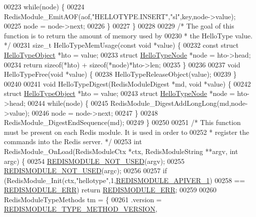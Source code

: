 \begin{DoxyCode}
{00223     \textcolor{keywordflow}{while}(node) \{
00224         RedisModule\_EmitAOF(aof,\textcolor{stringliteral}{"HELLOTYPE.INSERT"},\textcolor{stringliteral}{"sl"},key,node->value);
00225         node = node->next;
00226     \}
00227 \}
00228 
00229 \textcolor{comment}{/* The goal of this function is to return the amount of memory used by}
00230 \textcolor{comment}{ * the HelloType value. */}
00231 size\_t HelloTypeMemUsage(\textcolor{keyword}{const} \textcolor{keywordtype}{void} *value) \{
00232     \textcolor{keyword}{const} \textcolor{keyword}{struct} \hyperlink{structHelloTypeObject}{HelloTypeObject} *hto = value;
00233     \textcolor{keyword}{struct} \hyperlink{structHelloTypeNode}{HelloTypeNode} *node = hto->head;
00234     \textcolor{keywordflow}{return} \textcolor{keyword}{sizeof}(*hto) + \textcolor{keyword}{sizeof}(*node)*hto->len;
00235 \}
00236 
00237 \textcolor{keywordtype}{void} HelloTypeFree(\textcolor{keywordtype}{void} *value) \{
00238     HelloTypeReleaseObject(value);
00239 \}
00240 
00241 \textcolor{keywordtype}{void} HelloTypeDigest(RedisModuleDigest *md, \textcolor{keywordtype}{void} *value) \{
00242     \textcolor{keyword}{struct} \hyperlink{structHelloTypeObject}{HelloTypeObject} *hto = value;
00243     \textcolor{keyword}{struct} \hyperlink{structHelloTypeNode}{HelloTypeNode} *node = hto->head;
00244     \textcolor{keywordflow}{while}(node) \{
00245         RedisModule\_DigestAddLongLong(md,node->value);
00246         node = node->next;
00247     \}
00248     RedisModule\_DigestEndSequence(md);
00249 \}
00250 
00251 \textcolor{comment}{/* This function must be present on each Redis module. It is used in order to}
00252 \textcolor{comment}{ * register the commands into the Redis server. */}
00253 \textcolor{keywordtype}{int} RedisModule\_OnLoad(RedisModuleCtx *ctx, RedisModuleString **argv, \textcolor{keywordtype}{int} argc) \{
00254     \hyperlink{redismodule_8h_a46d75d81383a00bd6b941af6cadf64c2}{REDISMODULE\_NOT\_USED}(argv);
00255     \hyperlink{redismodule_8h_a46d75d81383a00bd6b941af6cadf64c2}{REDISMODULE\_NOT\_USED}(argc);
00256 
00257     \textcolor{keywordflow}{if} (RedisModule\_Init(ctx,\textcolor{stringliteral}{"hellotype"},1,\hyperlink{redismodule_8h_a1fc9be44e4cd6d60f7129d4393b6b580}{REDISMODULE\_APIVER\_1})
00258         == \hyperlink{redismodule_8h_a3df6f5bd5247289e66f44437a7cddd49}{REDISMODULE\_ERR}) \textcolor{keywordflow}{return} \hyperlink{redismodule_8h_a3df6f5bd5247289e66f44437a7cddd49}{REDISMODULE\_ERR};
00259 
00260     RedisModuleTypeMethods tm = \{
00261         .version = \hyperlink{redismodule_8h_aaab768795ed94afdaad24fefae993d22}{REDISMODULE\_TYPE\_METHOD\_VERSION},
}
\end{DoxyCode}

